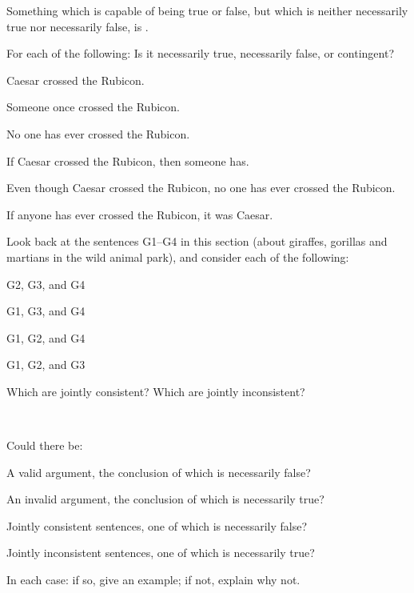 Something which is capable of being true or false, but which is neither necessarily true nor necessarily false, is .



\practiceproblems
\problempart
\label{pr.EnglishTautology}
For each of the following: Is it necessarily true, necessarily false, or contingent?
\begin{earg}
\item Caesar crossed the Rubicon.
\item Someone once crossed the Rubicon.
\item No one has ever crossed the Rubicon.
\item If Caesar crossed the Rubicon, then someone has.
\item Even though Caesar crossed the Rubicon, no one has ever crossed the Rubicon.
\item If anyone has ever crossed the Rubicon, it was Caesar.
\end{earg}

\problempart
\label{pr.MartianGiraffes}
Look back at the sentences G1--G4 in this section (about giraffes, gorillas and martians in the wild animal park), and consider each of the following:
\begin{earg}
\item G2, G3, and G4
\item G1, G3, and G4
\item G1, G2, and G4
\item G1, G2, and G3
\end{earg}
Which are jointly consistent? Which are jointly inconsistent?

\

\problempart
Could there be:
\begin{earg}
\item A valid argument, the conclusion of which is necessarily false?
\item An invalid argument, the conclusion of which is necessarily true?
\item Jointly consistent sentences, one of which is necessarily false?
\item Jointly inconsistent sentences, one of which is necessarily true?
\end{earg}
In each case: if so, give an example; if not, explain why not.